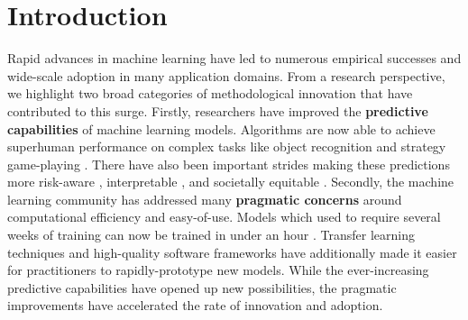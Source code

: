 \chapter{Introduction}
\label{chapt:introduction}









Rapid advances in machine learning have led to numerous empirical successes and wide-scale adoption in many application domains.
From a research perspective, we highlight two broad categories of methodological innovation that have contributed to this surge.
Firstly, researchers have improved the {\bf predictive capabilities} of machine learning models.
Algorithms are now able to achieve superhuman performance on complex tasks like object recognition \cite{} and strategy game-playing \cite{}.
There have also been important strides making these predictions more risk-aware \cite{}, interpretable \cite{}, and societally equitable \cite{}.
Secondly, the machine learning community has addressed many {\bf pragmatic concerns} around computational efficiency and easy-of-use.
Models which used to require several weeks of training can now be trained in under an hour \cite{}.
Transfer learning techniques \cite{} and high-quality software frameworks have additionally made it easier for practitioners to rapidly-prototype new models.
While the ever-increasing predictive capabilities have opened up new possibilities, the pragmatic improvements have accelerated the rate of innovation and adoption.

